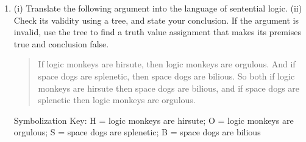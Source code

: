 \documentclass[12pt]{article}
\begin{document}
\begin{enumerate}
\item (i) Translate the following argument into the language of sentential logic. (ii) Check its validity using a tree, and state your conclusion. If the argument is invalid, use the tree to find a truth value assignment that makes its premises true and conclusion false.

\begin{quote}
If logic monkeys are hirsute, then logic monkeys are orgulous. And if space dogs are splenetic, then space dogs are bilious. So both if logic monkeys are hirsute then space dogs are bilious, and if space dogs are splenetic then logic monkeys are orgulous. 
\end{quote}

Symbolization Key: H = logic monkeys are hirsute; O = logic monkeys are orgulous; S = space dogs are splenetic; B = space dogs are bilious

\fi 






























\end{enumerate}
\end{document}
